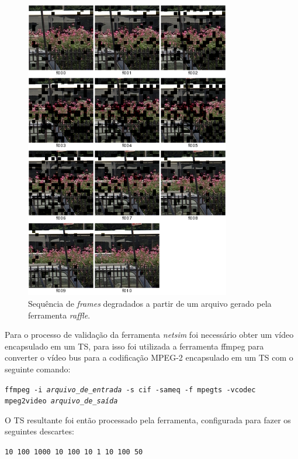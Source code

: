 \begin{figure}[!htb]
	\centering
	\includegraphics[width=0.8\textwidth]{./imgs/busraffle.png}
	\caption[Sequência de \emph{frames} degradados]{Sequência de \emph{frames} degradados a partir de um arquivo gerado pela ferramenta \emph{raffle}.}
	\label{fig:busraffle}
\end{figure}

Para o processo de validação da ferramenta \emph{netsim} foi necessário obter um vídeo encapsulado em um TS, para isso foi utilizada a ferramenta ffmpeg \cite{ffmpeg} para converter o vídeo bus para a codificação MPEG-2 encapsulado em um TS com o seguinte comando:

{
	\centering
	\texttt{ffmpeg -i \emph{arquivo\_de\_entrada} -s cif -sameq -f mpegts -vcodec mpeg2video \emph{arquivo\_de\_saída}}
}

O TS resultante foi então processado pela ferramenta, configurada para fazer os seguintes descartes:

\begin{center}
	\texttt{10 100
	1000 10
	100 10
	1 10
	100 50}
\end{center}

